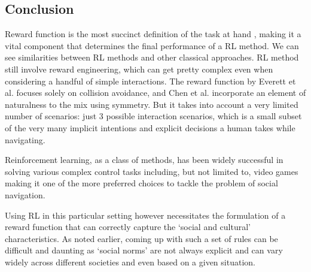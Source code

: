 \subsection*{Conclusion}

Reward function is the most succinct definition of the task at hand \cite{abbeel_apprenticeshiplearning_2004}, making it a vital component that determines the final performance of a RL method. We can see similarities between RL methods and other classical approaches. RL method still involve reward engineering, which can get pretty complex even when considering a handful of simple interactions. The reward function by Everett et al. \cite{everett_collision_2019} focuses solely on collision avoidance, and Chen et al. \cite{chen_socially_2017} incorporate an element of naturalness to the mix using symmetry. But it takes into account a very limited number of scenarios: just 3 possible interaction scenarios, which is a small subset of the very many implicit intentions and explicit decisions a human takes while navigating.
 
Reinforcement learning, as a class of methods, has been widely successful in solving various complex control tasks including, but not limited to, video games making it one of the more preferred choices to tackle the problem of social navigation. \par
Using RL in this particular setting however necessitates the formulation of a reward function that can correctly capture the `social and cultural' characteristics. As noted earlier, coming up with such a set of rules can be difficult and daunting as `social norms' are not always explicit and can vary widely across different societies and even based on a given situation.\\

